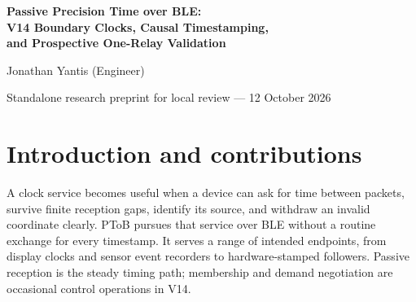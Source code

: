 \documentclass[11pt,letterpaper]{article}
\newcommand{\ns}{\,\mathrm{ns}}\newcommand{\us}{\,\mu\mathrm{s}}\newcommand{\ms}{\,\mathrm{ms}}\newcommand{\ppb}{\,\mathrm{ppb}}\newcommand{\code}[1]{\texttt{#1}}\newcolumntype{L}[1]{>{\RaggedRight\arraybackslash}p{#1}}
\begin{document}
\thispagestyle{plain}
\begin{center}
{\LARGE\bfseries Passive Precision Time over BLE:\\V14 Boundary Clocks, Causal Timestamping,\\and Prospective One-Relay Validation\par}
\vspace{9pt}Jonathan Yantis (Engineer)\par
{\small Standalone research preprint for local review --- 12 October 2026}
\end{center}
\begin{abstract}
Passive Precision Time over BLE (PToB) distributes a software clock through broadcast physical-event observations and later timestamp corrections. V14 extends the original passive protocol into an authenticated clock-distribution architecture that separates independently sourced grandmasters, direct coordination and standby, dedicated relay clocks, and clients. A relay disciplines its local counter-to-time map and regenerates downstream events independently of the arrival of each upstream correction, preserving root provenance and inherited age. Complete 190-byte periodic records replace multipart timing assembly, while occasional authenticated admission renewals preserve passive steady reception. We describe the frozen V14-RC1 protocol, its six validated byte layouts and 33 offline vectors, and the engineering corrections that enabled physical boundary-clock service. A direct calibration on 520 valid causal PPS samples fixed a provisional $+10543\ns$ receive correction per link before a separate one-relay experiment. Over 601.576 s, the leaf's already-available delivered map measured $-18.417\ns$ signed mean phase, $62.504\ns$ uncentered RMS and $59.729\ns$ demeaned jitter against an independent local PPS witness, with absolute P95/P99/maximum 123.25/160.25/191 ns. The 436 usable samples are reported against 504 observed edges and 602 conservative nominal boundaries, giving 72.425\% coverage; reference gaps and map expiries remain part of the result. Smooth renewal and continued normal service demonstrate a working distribution mechanism. These internal fractional-second measurements support the architecture under the recorded profile; calibrated electrical-output accuracy, absolute UTC association, continuous precision and physical two-relay performance require additional metrology.
\end{abstract}

\section{Introduction and contributions}
A clock service becomes useful when a device can ask for time between packets, survive finite reception gaps, identify its source, and withdraw an invalid coordinate clearly. PToB pursues that service over BLE without a routine exchange for every timestamp. It serves a range of intended endpoints, from display clocks and sensor event recorders to hardware-stamped followers. Passive reception is the steady timing path; membership and demand negotiation are occasional control operations in V14.
\end{document}
